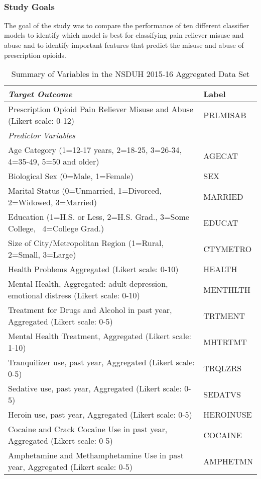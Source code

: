 \\\documentclass[sigconf]{acmart}
\begin{document}

\subsubsection{Study Goals}

The goal of the study was to compare the performance of ten different 
classifier models to identify which model is best for classifying pain 
reliever misuse and abuse and to identify important features that 
predict the misuse and abuse of prescription opioids.


\begin{table*}[ht]
  \caption{Summary of Variables in the NSDUH 2015-16 Aggregated Data Set}
  \label{tab:freq}
  \begin{tabular}{ll}
    \toprule
    \textit{Target Outcome} & Label \\
    \midrule
    Prescription Opioid Pain Reliever Misuse and Abuse (Likert scale: 0-12)& PRLMISAB  \\
    \midrule
    \textit{Predictor Variables}&   \\
    \midrule
    Age Category (1=12-17 years, 2=18-25, 3=26-34, 4=35-49, 5=50 and older)& AGECAT \\
    Biological Sex (0=Male, 1=Female)& SEX  \\
    Marital Status (0=Unmarried, 1=Divorced, 2=Widowed, 3=Married)& MARRIED  \\
    Education (1=H.S. or Less, 2=H.S. Grad., 3=Some College,  4=College Grad.)& EDUCAT  \\
    Size of City/Metropolitan Region (1=Rural, 2=Small, 3=Large)& CTYMETRO  \\
    Health Problems Aggregated  (Likert scale: 0-10)& HEALTH  \\
    Mental Health, Aggregated: adult depression, emotional distress (Likert scale: 0-10)& MENTHLTH  \\
    Treatment for Drugs and Alcohol in past year, Aggregated (Likert scale: 0-5)& TRTMENT  \\
    Mental Health Treatment, Aggregated (Likert scale: 1-10)& MHTRTMT  \\
    Tranquilizer use, past year, Aggregated (Likert scale: 0-5)& TRQLZRS \\
    Sedative use, past year, Aggregated (Likert scale: 0-5)& SEDATVS  \\
    Heroin use, past year, Aggregated (Likert scale: 0-5)& HEROINUSE  \\
    Cocaine and Crack Cocaine Use in past year, Aggregated  (Likert scale: 0-5)& COCAINE  \\
    Amphetamine and Methamphetamine Use in past year, Aggregated (Likert scale: 0-5)& AMPHETMN  \\
    \bottomrule
  \end{tabular}
\end{table*}
\end{document}
